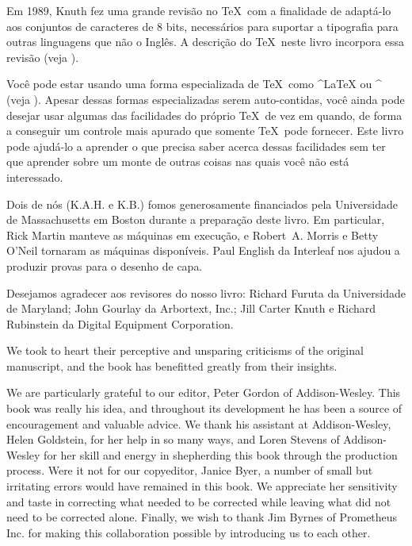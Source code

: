 Em 1989, Knuth fez uma grande revis\~ao no \TeX\ com a finalidade de 
adapt\'a-lo aos conjuntos de caracteres de $8$ bits, necess\'arios para 
suportar a tipografia para outras linguagens que n\~ao o Ingl\^es.  A 
descri\c c\~ao do \TeX\ neste livro incorpora essa revis\~ao (veja 
).

{\tighten Voc\^e pode estar usando uma forma especializada de \TeX\, 
como ^{\LaTeX} ou ^{\AMSTeX} (veja ).  Apesar dessas 
formas especializadas serem auto-contidas, voc\^e ainda pode desejar 
usar algumas das facilidades do pr\'oprio \TeX\ de vez em quando, de 
forma a conseguir um controle mais apurado que somente \TeX\ pode 
fornecer.  Este livro pode ajud\'a-lo a aprender o que precisa saber 
acerca dessas facilidades sem ter que aprender sobre um monte de outras 
coisas nas quais voc\^e n\~ao est\'a interessado.  \par}

Dois de n\'os (K.A.H. e K.B.) fomos generosamente financiados pela 
Universidade de Massachusetts em Boston durante a prepara\c c\~ao deste 
livro.  Em particular, Rick Martin manteve as m\'aquinas em 
execu\c c\~ao, e Robert~A. Morris e Betty O'Neil tornaram as m\'aquinas 
dispon\'iveis.  Paul English da Interleaf nos ajudou a produzir provas 
para o desenho de capa.

Desejamos agradecer aos revisores do nosso livro: Richard Furuta da 
Universidade de Maryland; John Gourlay da Arbortext, Inc.; Jill Carter
Knuth e Richard Rubinstein da Digital Equipment Corporation.








We took to heart their perceptive and unsparing criticisms of the original manuscript, and the book has benefitted greatly from their insights.

We are particularly grateful to our editor, Peter Gordon of
Addison-Wesley.  This book was really his idea, and throughout its
development he has been a source of encouragement and valuable
advice.  We thank his assistant at Addison-Wesley, Helen Goldstein, for
her help in so many ways, and Loren Stevens of Addison-Wesley for her
skill and energy in shepherding this book through the production
process.  Were it not for our copyeditor, Janice Byer, a number of small
but irritating errors would have remained in this book.  We appreciate
her sensitivity and taste in correcting what needed to be corrected
while leaving what did not need to be corrected alone.  Finally, we wish
to thank Jim Byrnes of Prometheus Inc. for making this collaboration
possible by introducing us to each other.
\baselineskip

